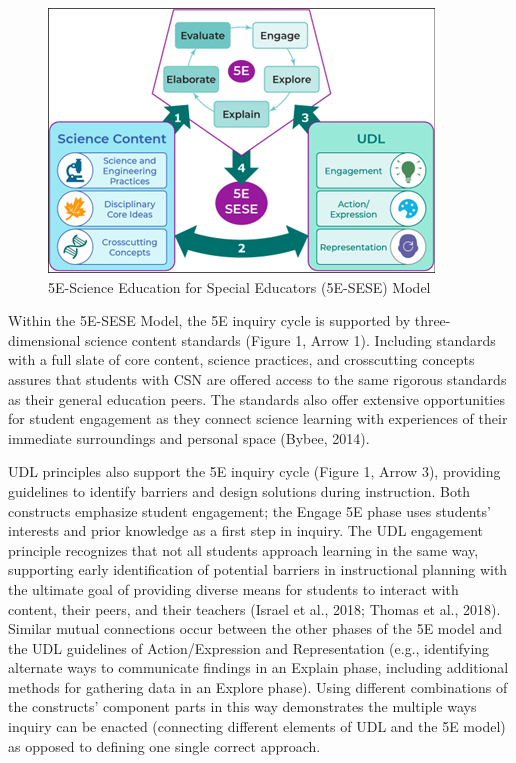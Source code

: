 \documentclass[11.5pt]{sig-alternate} %
\begin{document}
\begin{large}
\begin{figure}[htb]
    \centering
    \includegraphics[width=\columnwidth]{images/fig1.png}
    \caption{5E-Science Education for Special Educators (5E-SESE) Model}
    \label{Figure 1}
\end{figure}

Within the 5E-SESE Model, the 5E inquiry cycle is supported by three-dimensional science content standards (Figure 1, Arrow 1). Including standards with a full slate of core content, science practices, and crosscutting concepts assures that students with CSN are offered access to the same rigorous standards as their general education peers. The standards also offer extensive opportunities for student engagement as they connect science learning with experiences of their immediate surroundings and personal space (Bybee, 2014).

UDL principles also support the 5E inquiry cycle (Figure 1, Arrow 3), providing guidelines to identify barriers and design solutions during instruction. Both constructs emphasize student engagement; the Engage 5E phase uses students’ interests and prior knowledge as a first step in inquiry. The UDL engagement principle recognizes that not all students approach learning in the same way, supporting early identification of potential barriers in instructional planning with the ultimate goal of providing diverse means for students to interact with content, their peers, and their teachers (Israel et al., 2018; Thomas et al., 2018). Similar mutual connections occur between the other phases of the 5E model and the UDL guidelines of Action/Expression and Representation (e.g., identifying alternate ways to communicate findings in an Explain phase, including additional methods for gathering data in an Explore phase). Using different combinations of the constructs’ component parts in this way demonstrates the multiple ways inquiry can be enacted (connecting different elements of UDL and the 5E model) as opposed to defining one single correct approach.


\end{large}
\end{document}

